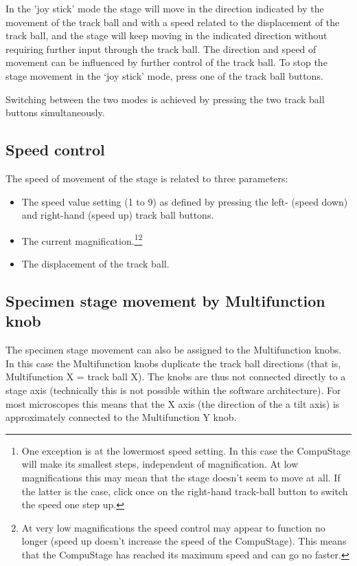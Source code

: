 \documentclass[12pt]{article}
\begin{document}
In the 'joy stick' mode the stage will move in the direction indicated
by the movement of the track ball and with a speed related to the
displacement of the track ball, and the stage will keep moving in the
indicated direction without requiring further input through the track
ball. The direction and speed of movement can be influenced by further
control of the track ball. To stop the stage movement in the `joy stick'
mode, press one of the track ball buttons.

Switching between the two modes is achieved by pressing the two track
ball buttons simultaneously.

\subsection{Speed control}

The speed of movement of the stage is related to three parameters:

\begin{itemize}
\item The speed value setting (1 to 9) as defined by pressing the
left- (speed down) and right-hand (speed up) track ball buttons.
\item The current magnification.\footnote{One exception is at the
lowermost speed setting. In this case the CompuStage will make its
smallest steps, independent of magnification. At low magnifications
this may mean that the stage doesn't seem to move at all. If the latter
is the case, click once on the right-hand track-ball button to switch
the speed one step up.}\footnote{ At very low magnifications the speed
control may appear to function no longer (speed up doesn't increase the
speed of the CompuStage). This means that the CompuStage has reached its
maximum speed and can go no faster.}
\item The displacement of the track ball.
\end{itemize}

\subsection{Specimen stage movement by Multifunction knob}

The specimen stage movement can also be assigned to the Multifunction
knobs. In this case the Multifunction knobs duplicate the track ball
directions (that is, Multifunction X = track ball X). The knobs
are thus not connected directly to a stage axis (technically this is
not possible within the software architecture). For most microscopes
this means that the X axis (the direction of the a tilt axis) is
approximately connected to the Multifunction Y knob.
\end{document}
